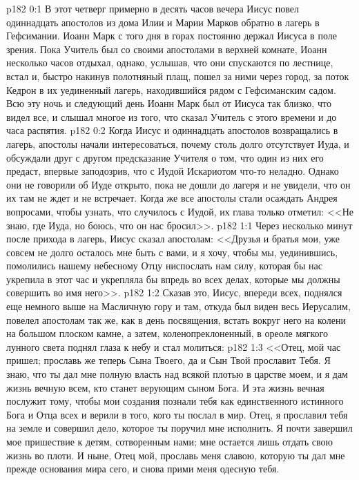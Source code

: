 \vs p182 0:1 В этот четверг примерно в десять часов вечера Иисус повел одиннадцать апостолов из дома Илии и Марии Марков обратно в лагерь в Гефсимании. Иоанн Марк с того дня в горах постоянно держал Иисуса в поле зрения. Пока Учитель был со своими апостолами в верхней комнате, Иоанн несколько часов отдыхал, однако, услышав, что они спускаются по лестнице, встал и, быстро накинув полотняный плащ, пошел за ними через город, за поток Кедрон в их уединенный лагерь, находившийся рядом с Гефсиманским садом. Всю эту ночь и следующий день Иоанн Марк был от Иисуса так близко, что видел все, и слышал многое из того, что сказал Учитель с этого времени и до часа распятия.
\vs p182 0:2 Когда Иисус и одиннадцать апостолов возвращались в лагерь, апостолы начали интересоваться, почему столь долго отсутствует Иуда, и обсуждали друг с другом предсказание Учителя о том, что один из них его предаст, впервые заподозрив, что с Иудой Искариотом что\hyp{}то неладно. Однако они не говорили об Иуде открыто, пока не дошли до лагеря и не увидели, что он их там не ждет и не встречает. Когда же все апостолы стали осаждать Андрея вопросами, чтобы узнать, что случилось с Иудой, их глава только отметил: <<Не знаю, где Иуда, но боюсь, что он нас бросил>>.
\vs p182 1:1 Через несколько минут после прихода в лагерь, Иисус сказал апостолам: <<Друзья и братья мои, уже совсем не долго осталось мне быть с вами, и я хочу, чтобы мы, уединившись, помолились нашему небесному Отцу ниспослать нам силу, которая бы нас укрепила в этот час и укрепляла бы впредь во всех делах, которые мы должны совершить во имя него>>.
\vs p182 1:2 Сказав это, Иисус, впереди всех, поднялся еще немного выше на Масличную гору и там, откуда был виден весь Иерусалим, повелел апостолам так же, как в день посвящения, встать вокруг него на колени на большом плоском камне, а затем, коленопреклоненный, в ореоле мягкого лунного света поднял глаза к небу и стал молиться:
\vs p182 1:3 <<Отец, мой час пришел; прославь же теперь Сына Твоего, да и Сын Твой прославит Тебя. Я знаю, что ты дал мне полную власть над всякой плотью в царстве моем, и я дам жизнь вечную всем, кто станет верующим сыном Бога. И эта жизнь вечная послужит тому, чтобы мои создания познали тебя как единственного истинного Бога и Отца всех и верили в того, кого ты послал в мир. Отец, я прославил тебя на земле и совершил дело, которое ты поручил мне исполнить. Я почти завершил мое пришествие к детям, сотворенным нами; мне остается лишь отдать свою жизнь во плоти. И ныне, Отец мой, прославь меня славою, которую ты дал мне прежде основания мира сего, и снова прими меня одесную тебя.
